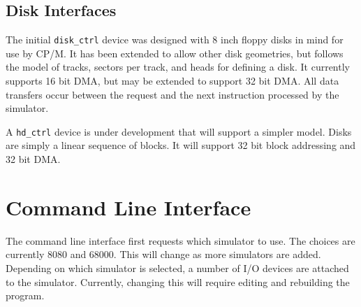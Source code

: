 \documentclass[10pt, openany]{book}
\begin{document}
\section{Disk Interfaces}
The initial \verb|disk_ctrl| device was designed with 8 inch floppy disks in mind for use by CP/M.  It has been extended to allow other disk geometries, but follows the model of tracks, sectors per track, and heads for defining a disk.  It currently supports 16 bit DMA, but may be extended to support 32 bit DMA.  All data transfers occur between the request and the next instruction processed by the simulator.

A \verb|hd_ctrl| device is under development that will support a simpler model.  Disks are simply a linear sequence of blocks.  It will support 32 bit block addressing and 32 bit DMA.

\chapter{Command Line Interface}
The command line interface first requests which simulator to use.  The choices are currently 8080 and 68000.  This will change as more simulators are added.  Depending on which simulator is selected, a number of I/O devices are attached to the simulator.  Currently, changing this will require editing and rebuilding the program.
\end{document}
